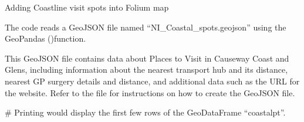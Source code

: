 \documentclass[letterpaper,10pt,english]{sphinxmanual}
\begin{document}
\begin{sphinxVerbatim}[commandchars=\\\{\}]
 
                 
                 
                   
                   
\end{sphinxVerbatim}

\sphinxAtStartPar
Adding Coastline visit spots into Folium map

\sphinxAtStartPar
The code reads a GeoJSON file named “NI\_Coastal\_spots.geojson” using the GeoPandas  ()function.

\sphinxAtStartPar
This GeoJSON file contains data about Places to Visit in Causeway Coast and Glens, including information about the nearest transport hub and its distance, nearest GP surgery details and distance, and additional data such as the URL for the website.
Refer to the  file for instructions on how to create the GeoJSON file.

\begin{sphinxVerbatim}[commandchars=\\\{\}]
  
\end{sphinxVerbatim}

\sphinxAtStartPar
\# Printing  would display the first few rows of the GeoDataFrame “coastalpt”.

\begin{sphinxVerbatim}[commandchars=\\\{\}]
\end{sphinxVerbatim}
\end{document}
